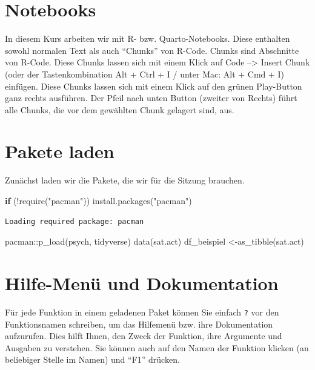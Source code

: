\documentclass[
  letterpaper,
  DIV=11,
  numbers=noendperiod]{scrreprt}
\newenvironment{Shaded}{\begin{snugshade}}{\end{snugshade}}
\newcommand{\ControlFlowTok}[1]{\textcolor[rgb]{0.00,0.23,0.31}{\textbf{#1}}}
\newcommand{\FunctionTok}[1]{\textcolor[rgb]{0.28,0.35,0.67}{#1}}
\newcommand{\NormalTok}[1]{\textcolor[rgb]{0.00,0.23,0.31}{#1}}
\newcommand{\OtherTok}[1]{\textcolor[rgb]{0.00,0.23,0.31}{#1}}
\newcommand{\SpecialCharTok}[1]{\textcolor[rgb]{0.37,0.37,0.37}{#1}}
\newcommand{\StringTok}[1]{\textcolor[rgb]{0.13,0.47,0.30}{#1}}
\begin{document}
\section{Notebooks}\label{notebooks}

In diesem Kurs arbeiten wir mit R- bzw. Quarto-Notebooks. Diese
enthalten sowohl normalen Text als auch ``Chunks'' von R-Code. Chunks
sind Abschnitte von R-Code. Diese Chunks lassen sich mit einem Klick auf
Code --\textgreater{} Insert Chunk (oder der Tastenkombination Alt +
Ctrl + I / unter Mac: Alt + Cmd + I) einfügen. Diese Chunks lassen sich
mit einem Klick auf den grünen Play-Button ganz rechts ausführen. Der
Pfeil nach unten Button (zweiter von Rechts) führt alle Chunks, die vor
dem gewählten Chunk gelagert sind, aus.

\section{Pakete laden}\label{pakete-laden-1}

Zunächst laden wir die Pakete, die wir für die Sitzung brauchen.

\begin{Shaded}
\begin{Highlighting}[]
\ControlFlowTok{if}\NormalTok{ (}\SpecialCharTok{!}\FunctionTok{require}\NormalTok{(}\StringTok{"pacman"}\NormalTok{)) }\FunctionTok{install.packages}\NormalTok{(}\StringTok{"pacman"}\NormalTok{)}
\end{Highlighting}
\end{Shaded}

\begin{verbatim}
Loading required package: pacman
\end{verbatim}

\begin{Shaded}
\begin{Highlighting}[]
\NormalTok{pacman}\SpecialCharTok{::}\FunctionTok{p\_load}\NormalTok{(psych, tidyverse)}
\FunctionTok{data}\NormalTok{(sat.act)}
\NormalTok{df\_beispiel }\OtherTok{\textless{}{-}}\FunctionTok{as\_tibble}\NormalTok{(sat.act)}
\end{Highlighting}
\end{Shaded}

\section{Hilfe-Menü und
Dokumentation}\label{hilfe-menuxfc-und-dokumentation}

Für jede Funktion in einem geladenen Paket können Sie einfach \texttt{?}
vor den Funktionsnamen schreiben, um das Hilfemenü bzw. ihre
Dokumentation aufzurufen. Dies hilft Ihnen, den Zweck der Funktion, ihre
Argumente und Ausgaben zu verstehen. Sie können auch auf den Namen der
Funktion klicken (an beliebiger Stelle im Namen) und ``F1'' drücken.
\end{document}
